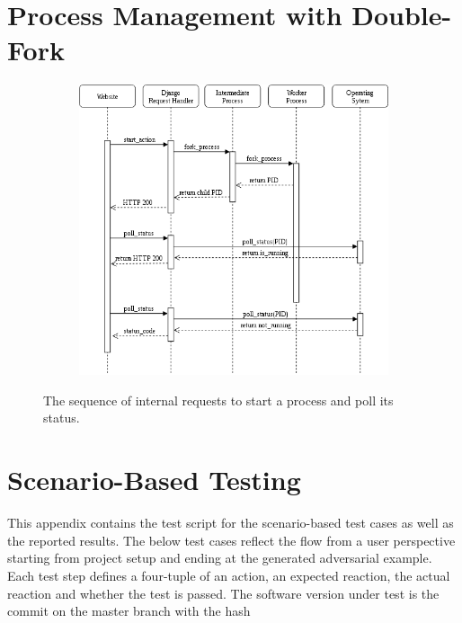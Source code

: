 \clearpage
\appendix
\section{Process Management with Double-Fork}\label{app:doublefork}
\begin{figure}[H]\label{fig:process_sequence}
	\centering
	\begin{subfigure}{1.2\linewidth}
		\centering
		\includegraphics[width=1.5\linewidth]{figs/process_sequence}
	\end{subfigure}
	\caption{The sequence of internal requests to start a process and poll its status.}
\end{figure}

\clearpage
\section{Scenario-Based Testing}\label{app:scenariotest}
This appendix contains the test script for the scenario-based test cases as well as the reported results.
The below test cases reflect the flow from a user perspective starting from project setup and ending at the generated adversarial example.
Each test step defines a four-tuple of an action, an expected reaction, the actual reaction and whether the test is passed.
The software version under test is the commit on the master branch with the hash %

